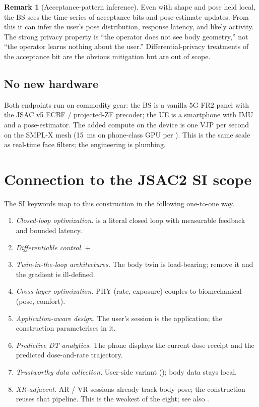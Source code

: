 \documentclass[11pt,a4paper]{article}
\theoremstyle{definition}
\newtheorem{remark}[remark]{Remark}
\begin{document}
\begin{remark}[Acceptance-pattern inference]\label{rem:accept-infer}
Even with shape and pose held local, the BS sees the time-series
of acceptance bits and pose-estimate updates.  From this it can
infer the user's pose distribution, response latency, and likely
activity.  The strong privacy property is ``the operator does not
see body geometry,'' not ``the operator learns nothing about the
user.''  Differential-privacy treatments of the acceptance bit are
the obvious mitigation but are out of scope.
\end{remark}

\subsection{No new hardware}

Both endpoints run on commodity gear: the BS is a vanilla 5G FR2
panel with the JSAC v5 ECBF / projected-ZF precoder; the UE is a
smartphone with IMU and a pose-estimator.  The added compute on the
device is one VJP per second on the SMPL-X mesh (\SI{15}{ms} on
phone-class GPU per ).  This is the same scale as
real-time face filters; the engineering is plumbing.

\section{Connection to the JSAC2 SI scope}\label{sec:si}

The SI keywords map to this construction in the following one-to-one
way.

\begin{enumerate}[leftmargin=1.6em,itemsep=2pt]
\item \emph{Closed-loop optimization.}   is a literal
closed loop with measurable feedback and bounded latency.
\item \emph{Differentiable control.}   +
.
\item \emph{Twin-in-the-loop architectures.}  The body twin is
load-bearing; remove it and the gradient is ill-defined.
\item \emph{Cross-layer optimization.}  PHY (rate, exposure) couples
to biomechanical (pose, comfort).
\item \emph{Application-aware design.}  The user's session is the
application; the construction parameterises in it.
\item \emph{Predictive DT analytics.}  The phone displays the
current dose receipt and the predicted dose-and-rate trajectory.
\item \emph{Trustworthy data collection.}  User-side variant
(); body data stays local.
\item \emph{XR-adjacent.}  AR / VR sessions already track body
pose; the construction reuses that pipeline.  This is the weakest
of the eight; see also .
\end{enumerate}
\end{document}
